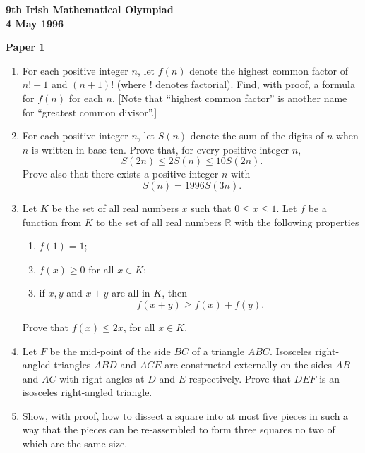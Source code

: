 \documentclass[12pt]{article}
\begin{document}
\begin{center}
{\large\bfseries 9th Irish Mathematical Olympiad\\4 May 1996}
\end{center}
\bigskip\noindent\textbf{Paper 1}\bigskip
\begin{enumerate}
\item For each positive integer $n$, let $f(n)$ denote the highest common factor of $n!+1$ and $(n+1)!$ (where $!$ denotes factorial). Find, with proof, a formula for $f(n)$ for each $n$. [Note that ``highest common factor'' is another name for ``greatest common divisor''.]

\item For each positive integer $n$, let $S(n)$ denote the sum of the digits of $n$ when $n$ is written in base ten. Prove that, for every positive integer $n$,
\[S(2n) \le 2S(n) \le 10S(2n).\]
Prove also that there exists a positive integer $n$ with
\[S(n) = 1996S(3n).\]

\item Let $K$ be the set of all real numbers $x$ such that $0 \le x \le 1$. Let $f$ be a function from $K$ to the set of all real numbers $\mathbb{R}$ with the following properties
\begin{enumerate}
\item[(a)] $f(1) = 1$;
\item[(b)] $f(x) \ge 0$ for all $x \in K$;
\item[(c)] if $x, y$ and $x + y$ are all in $K$, then
\[f(x+y) \ge f(x) + f(y).\]
\end{enumerate}
Prove that $f(x) \le 2x$, for all $x \in K$.

\item Let $F$ be the mid-point of the side $BC$ of a triangle $ABC$. Isosceles right-angled triangles $ABD$ and $ACE$ are constructed externally on the sides $AB$ and $AC$ with right-angles at $D$ and $E$ respectively. Prove that $DEF$ is an isosceles right-angled triangle.

\item Show, with proof, how to dissect a square into at most five pieces in such a way that the pieces can be re-assembled to form three squares no two of which are the same size.
\end{enumerate}
\end{document}
